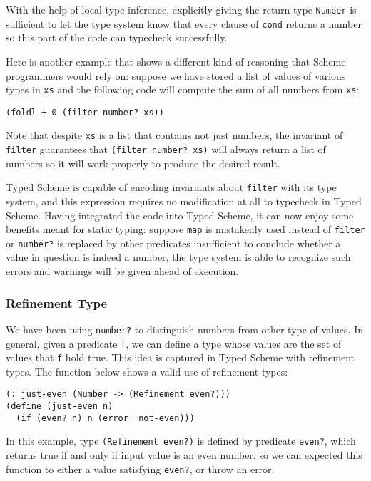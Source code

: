 With the help of local type inference\cite{pierce2000local},
explicitly giving the return type \texttt{Number}
is sufficient to let the type system know that every clause of \texttt{cond} returns a number
so this part of the code can typecheck successfully.

Here is another example that shows a different kind of reasoning
that Scheme programmers would rely on:
suppose we have stored a list of values of various types in \texttt{xs}
and the following code will compute the sum of all numbers from \texttt{xs}:

\begin{verbatim}
(foldl + 0 (filter number? xs))
\end{verbatim}

Note that despite \texttt{xs} is a list that contains not just numbers,
the invariant of \texttt{filter} guarantees that
\texttt{(filter number? xs)} will always return a list of numbers
so it will work properly to produce the desired result.

Typed Scheme is capable of encoding invariants about \texttt{filter} with its type system,
and this expression requires no modification at all to typecheck in Typed Scheme.
Having integrated the code into Typed Scheme, it can now enjoy some benefits meant for static typing:
 suppose \texttt{map} is mistakenly
used instead of \texttt{filter} or \texttt{number?} is replaced by
other predicates insufficient to conclude whether a value in question is indeed a number,
the type system is able to recognize such errors and warnings will be given ahead of execution.

\subsubsection{Refinement Type}

We have been using \texttt{number?} to distinguish numbers
from other type of values.
In general, given a predicate \texttt{f}, we can define 
a type whose values are the set of values that \texttt{f} hold true.
This idea is captured in Typed Scheme with refinement types\cite{freeman1991refinement}.
The function below shows a valid use of refinement types:

\begin{verbatim}
(: just-even (Number -> (Refinement even?)))
(define (just-even n)
  (if (even? n) n (error 'not-even)))
\end{verbatim}

In this example, type \texttt{(Refinement even?)} is defined by predicate \texttt{even?},
which returns true if and only if input value is an even number.
so we can expected this function to either a value satisfying \texttt{even?}, or throw an error.


